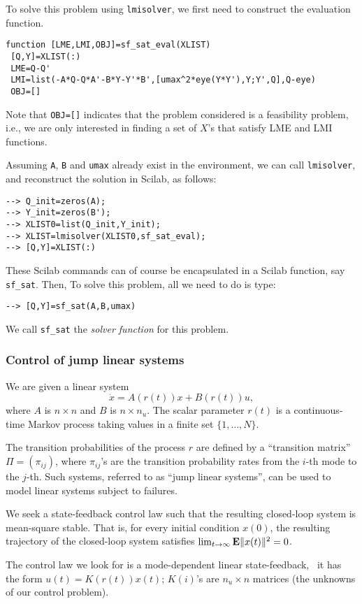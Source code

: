 \documentclass{article}
\begin{document}
To solve this problem using {\tt lmisolver},  we first need to construct
the evaluation function.
\begin{verbatim}
function [LME,LMI,OBJ]=sf_sat_eval(XLIST)
 [Q,Y]=XLIST(:)
 LME=Q-Q'
 LMI=list(-A*Q-Q*A'-B*Y-Y'*B',[umax^2*eye(Y*Y'),Y;Y',Q],Q-eye)
 OBJ=[]
\end{verbatim}
Note that {\tt OBJ=[]} indicates that
the problem considered is a feasibility problem, i.e., we are only
interested in finding a set of $X$'s that satisfy LME and LMI functions.


Assuming {\tt A}, {\tt B} and {\tt umax}
already exist in the environment, we can call {\tt lmisolver}, and
reconstruct the solution in Scilab, as follows:
\begin{verbatim}
--> Q_init=zeros(A);
--> Y_init=zeros(B');
--> XLIST0=list(Q_init,Y_init);
--> XLIST=lmisolver(XLIST0,sf_sat_eval);
--> [Q,Y]=XLIST(:)
\end{verbatim}
These Scilab commands can of course be encapsulated in
a Scilab function, say {\tt sf{\_}sat}. Then, To solve this problem,
all we need to do is type:
\begin{verbatim}
--> [Q,Y]=sf_sat(A,B,umax) 
\end{verbatim}
We call {\tt sf{\_}sat} the {\em solver function} for this problem.



\subsubsection{Control of jump linear systems}
\label{ex2}
We are given a linear system 
\[
\dot{x} = A(r(t))x+B(r(t))u,
\]
where $A$ is $n \times n$ and $B$ is $n \times n_u$.   The scalar
parameter $r(t)$ is a continuous-time Markov process taking values in
a finite set $\{1,\ldots,N\}$. 

The transition probabilities of the process $r$ are defined by a
``transition matrix'' $\Pi = (\pi_{ij})$, where $\pi_{ij}$'s are the 
transition probability rates from
the $i$-th mode to the $j$-th.  Such systems, referred to as ``jump
linear systems'', can be used to model linear systems subject to
failures.

We seek a state-feedback control law such that the resulting
closed-loop system is mean-square stable.  That is, for every initial
condition $x(0)$, the resulting trajectory of the closed-loop system
satisfies $\lim_{t \rightarrow \infty} \mbox{\bf E} \| x(t) \| ^2 = 0$.

The control law we look for is a mode-dependent linear state-feedback,
\ie\ it has the form $u(t) = K(r(t))x(t)$; $K(i)$'s are $n_u \times n$ matrices (the
unknowns of our control problem). 
\end{document}
